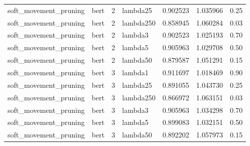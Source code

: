 \begin{tabular}{llllrrr}
soft\_movement\_pruning &  bert &   2 &     lambda25 &  0.902523 & 1.035966 &    0.25 \\
soft\_movement\_pruning &  bert &   2 &    lambda250 &  0.858945 & 1.060284 &    0.03 \\
soft\_movement\_pruning &  bert &   2 &      lambda3 &  0.902523 & 1.025193 &    0.70 \\
soft\_movement\_pruning &  bert &   2 &      lambda5 &  0.905963 & 1.029708 &    0.50 \\
soft\_movement\_pruning &  bert &   2 &     lambda50 &  0.879587 & 1.051291 &    0.15 \\
soft\_movement\_pruning &  bert &   3 &      lambda1 &  0.911697 & 1.018469 &    0.90 \\
soft\_movement\_pruning &  bert &   3 &     lambda25 &  0.891055 & 1.043730 &    0.25 \\
soft\_movement\_pruning &  bert &   3 &    lambda250 &  0.866972 & 1.063151 &    0.03 \\
soft\_movement\_pruning &  bert &   3 &      lambda3 &  0.905963 & 1.034298 &    0.70 \\
soft\_movement\_pruning &  bert &   3 &      lambda5 &  0.899083 & 1.032151 &    0.50 \\
soft\_movement\_pruning &  bert &   3 &     lambda50 &  0.892202 & 1.057973 &    0.15 \\
\bottomrule
\end{tabular}
